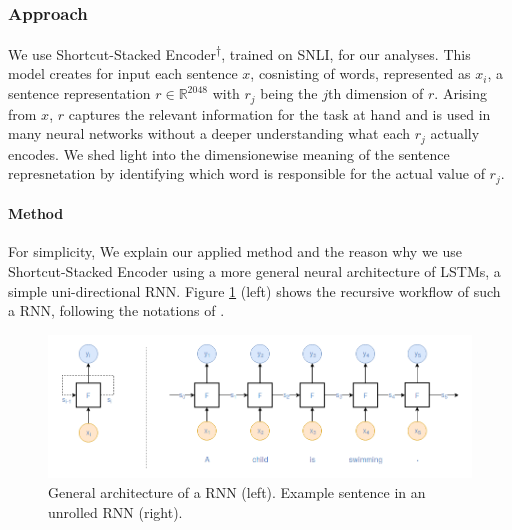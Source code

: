 \subsubsection{Approach}
We use Shortcut-Stacked Encoder\textsuperscript{$\dagger$}, trained on \ac{SNLI}, for our analyses. This model creates for input each sentence $x$, cosnisting of words, represented as $x_i$, a sentence representation $r \in \mathbb{R}^{2048}$ with $r_j$ being the $j$th dimension of $r$. Arising from $x$, $r$ captures the relevant information for the task at hand and is used in many neural networks without a deeper understanding what each $r_j$ actually encodes. We shed light into the dimensionewise meaning of the sentence represnetation by identifying which word is responsible for the actual value of $r_j$. 
\paragraph*{Method}\label{sec:understanding1_method}
For simplicity, We explain our applied method and the reason why we use Shortcut-Stacked Encoder using a more general neural architecture of \ac{LSTM}s, a simple uni-directional \ac{RNN}.
Figure \ref{fig:rnn} (left) shows the recursive workflow of such a \ac{RNN}, following the notations of \cite{goldberg2017Apr}.
\begin{figure}[tph!]
\centering
	\includegraphics[totalheight=5.5cm]{fig/rnn.png}
	\caption{General architecture of a \ac{RNN} (left). Example sentence in an unrolled \ac{RNN} (right).}
	\label{fig:rnn}
\end{figure}
